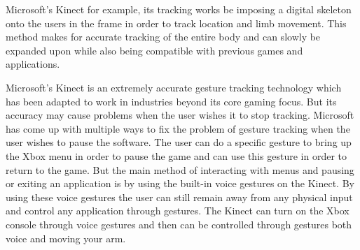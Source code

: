 Microsoft's Kinect for example, its tracking works be imposing a digital skeleton onto the users in the frame in order to track location and limb movement. This method makes for accurate tracking of the entire body and can slowly be expanded upon while also being compatible with previous games and applications. 

Microsoft's Kinect is an extremely accurate gesture tracking technology which has been adapted to work in industries beyond its core gaming focus. But its accuracy may cause problems when the user wishes it to stop tracking. Microsoft has come up with multiple ways to fix the problem of gesture tracking when the user wishes to pause the software. The user can do a specific gesture to bring up the Xbox menu in order to pause the game and can use this gesture in order to return to the game. But the main method of interacting with menus and pausing or exiting an application is by using the built-in voice gestures on the Kinect. By using these voice gestures the user can still remain away from any physical input and control any application through gestures. The Kinect can turn on the Xbox console through voice gestures and then can be controlled through gestures both voice and moving your arm.